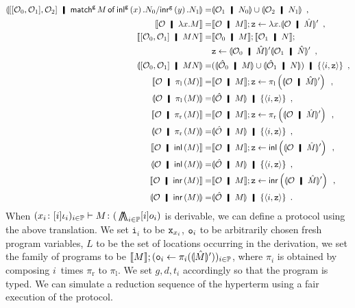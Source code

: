 {{\begin{align*}
  \semoi{\cotuple{\cotuple{\hypert_0,\hypert_1},\hypert_2}\hmid \gmat  M x {N_0} y {N_1}}
 =&\semoi{\hypert_1 \hmid N_0}\cup \semoi{\hypert_2 \hmid N_1}\enspace,\\
 \semo{\hypert\hmid \lambda x.M}=& \semo{\hypert\hmid M}; \p z\leftarrow
 \lambda x. \semoi{\hypert\hmid\hat M}' \enspace,\\
 \semo{\cotuple{\hypert_0,\hypert_1}\hmid MN}=& \semo{\hypert_0\hmid M}; \semo{\hypert_1\hmid N}; \\&
 \p z\leftarrow \semoi{\hypert_0\hmid \hat M}'\semoi{\hypert_1\hmid \hat N}'\enspace,\\
 \semoi{\cotuple{\hypert_0,\hypert_1}\hmid MN} =& (\semoi{\hat \hypert_0 \hmid M}\cup
 \semoi{\hat\hypert_1\hmid N})\hmid \{\tuple{i,\p z}\}\enspace, \\
 \semo{\hypert\hmid \lpil M} =& \semo{\hypert\hmid M}; \p z \leftarrow
 \lpil {\semoi{\hypert\hmid\hat M}'}\enspace, \\
 \semoi{\hypert\hmid \lpil M}=& \semoi{\hat \hypert\hmid M}\hmid
 \{\tuple{i, \p z}\}\enspace, \\
 \semo{\hypert\hmid \lpir M} =& \semo{\hypert\hmid M}; \p z \leftarrow
 \lpir{ \semoi{\hypert\hmid\hat M}' }\enspace, \\
 \semoi{\hypert\hmid \lpir M}=& \semoi{\hat \hypert\hmid M}\hmid
 \{\tuple{i, \p z}\}\enspace, \\
 \semo{\hypert\hmid \linl{M}} =& \semo{\hypert\hmid M}; \p z \leftarrow
 \linl{ \semoi{\hypert\hmid\hat M}'}\enspace, \\
 \semoi{\hypert\hmid \linl M}=& \semoi{\hat \hypert\hmid M}\hmid
 \{\tuple{i, \p z}\}\enspace, \\
 \semo{\hypert\hmid \linr M} =& \semo{\hypert\hmid M}; \p z \leftarrow
 \linr{\semoi{\hypert\hmid\hat M}'}\enspace, \\
 \semoi{\hypert\hmid \linr{M}}=& \semoi{\hat \hypert\hmid M}\hmid
 \{\tuple{i, \p z}\}\enspace.
\end{align*} }
When $({x_i} \colon{[i]\iota_i})_{i\in\mathbb{P}}
\vdash{M} \colon{(}\operatorname*{\bigwedge\kern -8pt \bigwedge}_{i\in \mathbb{P}}[i]o_i)$ is
derivable,
we can define a protocol using the above translation.
We set $\mathtt i_i$ to be ${\texttt{x}}_{x_i}$, ${\texttt{o}}_i$ to be arbitrarily
chosen fresh program variables, $L$ to be the set of locations
occurring in the derivation, we set the family of programs to be
$\llbracket{M}\rrbracket; ({\texttt{o}}_i\leftarrow \pi_i(\llparenthesis{\hat M}\rrparenthesis'))_{i\in\mathbb{P}}$,
where $\pi_i$ is obtained by composing $i$~times $\pi_{\mathrm r}$ to
$\pi_{\mathrm l}$.
We set $g,d,t_i$ accordingly so that the program is typed.
We can simulate a reduction sequence of
the hyperterm using a fair execution of the protocol.


}
